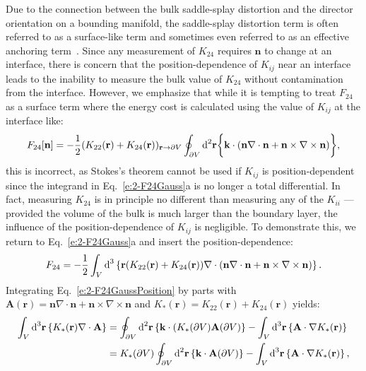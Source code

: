 Due to the connection between the bulk saddle-splay distortion and the director orientation on a bounding manifold, the saddle-splay distortion term is often referred to as a surface-like term and sometimes even referred to as an effective anchoring term~\cite{RN206,RN33,RN194,RN58,RN57,RN151}.
Since any measurement of $K_{24}$ requires $\mathbf{n}$ to change at an interface, there is concern that the position-dependence of $K_{ij}$ near an interface leads to the inability to measure the bulk value of $K_{24}$ without contamination from the interface.
However, we emphasize that while it is tempting to treat $F_{24}$ as a surface term where the energy cost is calculated using the value of $K_{ij}$ at the interface like:
\begin{equation}
  F_{24}[\mathbf{n}] = - \frac{1}{2}(K_{22}(\mathbf{r}) + K_{24}(\mathbf{r}))_{\mathbf{r} \rightarrow \partial V} \oint_{\partial V} \textup{d}^2  \mathbf{r} \bigg \{   \mathbf{k} \cdot (\mathbf{n}\nabla \cdot \mathbf{n} + \mathbf{n} \times \nabla \times \mathbf{n}) \bigg \},
\end{equation}
this is incorrect, as Stokes's theorem cannot be used if $K_{ij}$ is position-dependent since the integrand in Eq.~\ref{e:2-F24Gauss}a is no longer a total differential.
In fact, measuring $K_{24}$ is in principle no different than measuring any of the $K_{ii}$ --- provided the volume of the bulk is much larger than the boundary layer, the influence of the position-dependence of $K_{ij}$ is negligible.
To demonstrate this, we return to Eq.~\ref{e:2-F24Gauss}a and insert the position-dependence:
\begin{equation}
  F_{24} = -\frac{1}{2}\int_{V}\textup{d}^3 \left \{\mathbf{r} (K_{22} (\mathbf{r}) + K_{24}(\mathbf{r})) \nabla \cdot (\mathbf{n} \nabla \cdot \mathbf{n} + \mathbf{n} \times \nabla \times \mathbf{n}) \right \}.\label{e:2-F24GaussPosition}
\end{equation}
Integrating Eq.~\ref{e:2-F24GaussPosition} by parts with $\mathbf{A}(\mathbf{r}) = \mathbf{n} \nabla \cdot \mathbf{n} + \mathbf{n} \times \nabla \times \mathbf{n}$ and $K_*(\mathbf{r}) = K_{22} (\mathbf{r}) + K_{24}(\mathbf{r})$ yields:
\begin{align}
  \int_{V}\textup{d}^3\mathbf{r} \left \{ K_{*} (\mathbf{r}) \nabla \cdot \mathbf{A} \right \} &=
  \oint_{\partial V}\textup{d}^2 \mathbf{r} \left \{ \mathbf{k} \cdot (K_{*} (\partial V) \mathbf{A}(\partial V) \right \} -  \int_{V} \textup{d}^3\mathbf{r} \left \{ \mathbf{A} \cdot \nabla K_{*} (\mathbf{r}) \right \}  \\ &=
  K_*(\partial V) \oint_{\partial V} \textup{d}^2\mathbf{r} \left \{ \mathbf{k} \cdot \mathbf{A}(\partial V)\right \} - \int_{V} \textup{d}^3\mathbf{r} \left \{ \mathbf{A} \cdot \nabla K_{*} (\mathbf{r}) \right \}, \label{e:2-pos_stokes1}
\end{align}
